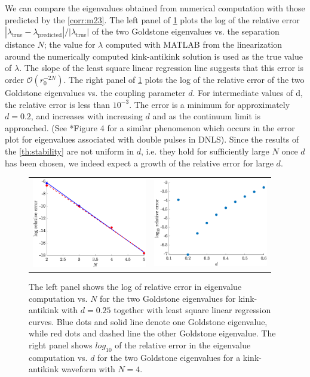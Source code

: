 \documentclass[12pt,reqno]{amsart}
\begin{document}
We can compare the eigenvalues obtained from numerical computation with those predicted by the \cref{corr:m23}. The left panel of \cref{fig:kakeigerror} plots the log of the relative error $| \lambda_{\text{true}} - \lambda_{\text{predicted}} |/| \lambda_{\text{true}} |$
of the two Goldstone eigenvalues vs. the separation distance $N$; the value for $\lambda$ computed with MATLAB from the linearization
around the numerically computed kink-antikink solution is used as the true value of $\lambda$.
The slope of the least square linear regression line suggests that this error is order $\mathcal{O}(r_0^{-2N})$. 
The right panel of \cref{fig:kakeigerror} plots the log of the relative error of the two Goldstone eigenvalues vs. the coupling parameter $d$. For intermediate values of d, the relative error is less than $10^{-3}$. The error is a minimum for approximately $d = 0.2$, and increases with increasing $d$ and as the
continuum limit is approached. (See \cite{Parker2020}*{Figure 4} for a similar phenomenon which occurs in the error plot for eigenvalues associated with double pulses in DNLS). Since the results of the \cref{th:stability} are not uniform in $d$, i.e. they hold for sufficiently large $N$ once $d$ has been chosen, we 
indeed expect a growth of the relative error for large $d$.

\begin{figure}
	\begin{center}
	\begin{tabular}{cc}
	\includegraphics[width=5cm]{goldstoned025relerror.eps} &
	\includegraphics[width=5cm]{goldstoneN4relativeerror.eps}
	\end{tabular}
	\end{center}
	\caption{The left panel shows the log of relative error in eigenvalue computation vs. $N$ for the two Goldstone eigenvalues for kink-antikink with $d = 0.25$ together with least square linear regression curves. Blue dots and solid line denote one Goldstone eigenvalue, while red dots and dashed line the other Goldstone eigenvalue. The right panel shows $log_{10}$ of the relative error in the eigenvalue computation vs. $d$ for the two Goldstone eigenvalues for a kink-antikink waveform
	with $N = 4$.} 
	\label{fig:kakeigerror}
\end{figure}
\end{document}

